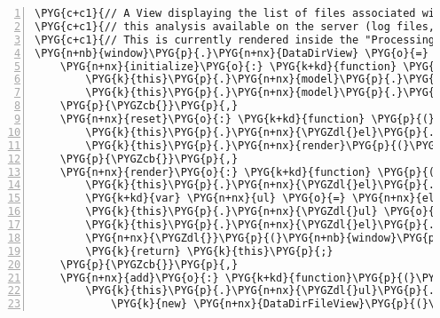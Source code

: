 \begin{Verbatim}[commandchars=\\\{\},numbers=left,firstnumber=1,stepnumber=5]
\PYG{c+c1}{// A View displaying the list of files associated with}
\PYG{c+c1}{// this analysis available on the server (log files, mostly).}
\PYG{c+c1}{// This is currently rendered inside the "Processing" section above.}
\PYG{n+nb}{window}\PYG{p}{.}\PYG{n+nx}{DataDirView} \PYG{o}{=} \PYG{n+nx}{Backbone}\PYG{p}{.}\PYG{n+nx}{View}\PYG{p}{.}\PYG{n+nx}{extend}\PYG{p}{(}\PYG{p}{\PYGZob{}}
    \PYG{n+nx}{initialize}\PYG{o}{:} \PYG{k+kd}{function} \PYG{p}{(}\PYG{p}{)} \PYG{p}{\PYGZob{}}
        \PYG{k}{this}\PYG{p}{.}\PYG{n+nx}{model}\PYG{p}{.}\PYG{n+nx}{bind}\PYG{p}{(}\PYG{l+s+s2}{"reset"}\PYG{p}{,} \PYG{k}{this}\PYG{p}{.}\PYG{n+nx}{reset}\PYG{p}{,} \PYG{k}{this}\PYG{p}{)}\PYG{p}{;}
        \PYG{k}{this}\PYG{p}{.}\PYG{n+nx}{model}\PYG{p}{.}\PYG{n+nx}{bind}\PYG{p}{(}\PYG{l+s+s2}{"add"}\PYG{p}{,} \PYG{k}{this}\PYG{p}{.}\PYG{n+nx}{add}\PYG{p}{,} \PYG{k}{this}\PYG{p}{)}\PYG{p}{;}
    \PYG{p}{\PYGZcb{}}\PYG{p}{,}
    \PYG{n+nx}{reset}\PYG{o}{:} \PYG{k+kd}{function} \PYG{p}{(}\PYG{n+nx}{model}\PYG{p}{,} \PYG{n+nx}{value}\PYG{p}{,} \PYG{n+nx}{options}\PYG{p}{)} \PYG{p}{\PYGZob{}}
        \PYG{k}{this}\PYG{p}{.}\PYG{n+nx}{\PYGZdl{}el}\PYG{p}{.}\PYG{n+nx}{empty}\PYG{p}{(}\PYG{p}{)}\PYG{p}{;}
        \PYG{k}{this}\PYG{p}{.}\PYG{n+nx}{render}\PYG{p}{(}\PYG{p}{)}\PYG{p}{;}
    \PYG{p}{\PYGZcb{}}\PYG{p}{,}
    \PYG{n+nx}{render}\PYG{o}{:} \PYG{k+kd}{function} \PYG{p}{(}\PYG{p}{)} \PYG{p}{\PYGZob{}}
        \PYG{k}{this}\PYG{p}{.}\PYG{n+nx}{\PYGZdl{}el}\PYG{p}{.}\PYG{n+nx}{append}\PYG{p}{(}\PYG{n+nx}{el}\PYG{p}{.}\PYG{n+nx}{h2}\PYG{p}{(}\PYG{l+s+s2}{"Data Directory"}\PYG{p}{)}\PYG{p}{)}\PYG{p}{;}
        \PYG{k+kd}{var} \PYG{n+nx}{ul} \PYG{o}{=} \PYG{n+nx}{el}\PYG{p}{.}\PYG{n+nx}{ul}\PYG{p}{(}\PYG{p}{)}\PYG{p}{;}
        \PYG{k}{this}\PYG{p}{.}\PYG{n+nx}{\PYGZdl{}ul} \PYG{o}{=} \PYG{n+nx}{\PYGZdl{}}\PYG{p}{(}\PYG{n+nx}{ul}\PYG{p}{)}\PYG{p}{;}
        \PYG{k}{this}\PYG{p}{.}\PYG{n+nx}{\PYGZdl{}el}\PYG{p}{.}\PYG{n+nx}{append}\PYG{p}{(}\PYG{n+nx}{ul}\PYG{p}{)}\PYG{p}{;}
        \PYG{n+nx}{\PYGZdl{}}\PYG{p}{(}\PYG{n+nb}{window}\PYG{p}{)}\PYG{p}{.}\PYG{n+nx}{scrollspy}\PYG{p}{(}\PYG{l+s+s1}{'refresh'}\PYG{p}{)}\PYG{p}{;}
        \PYG{k}{return} \PYG{k}{this}\PYG{p}{;}
    \PYG{p}{\PYGZcb{}}\PYG{p}{,}
    \PYG{n+nx}{add}\PYG{o}{:} \PYG{k+kd}{function}\PYG{p}{(}\PYG{n+nx}{model}\PYG{p}{)} \PYG{p}{\PYGZob{}}
        \PYG{k}{this}\PYG{p}{.}\PYG{n+nx}{\PYGZdl{}ul}\PYG{p}{.}\PYG{n+nx}{append}\PYG{p}{(}
            \PYG{k}{new} \PYG{n+nx}{DataDirFileView}\PYG{p}{(}\PYG{p}{\PYGZob{}}\PYG{n+nx}{model}\PYG{o}{:} \PYG{n+nx}{model}\PYG{p}{\PYGZcb{}}\PYG{p}{)}\PYG{p}{.}\PYG{n+nx}{render}\PYG{p}{(}\PYG{p}{)}\PYG{p}{.}\PYG{n+nx}{el}

\end{Verbatim}
